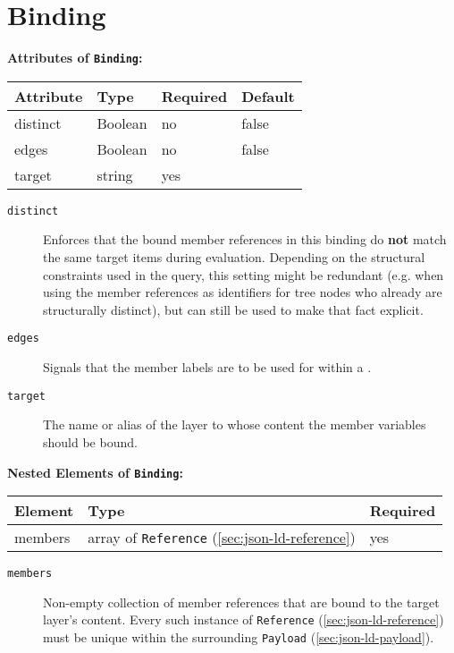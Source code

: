 \documentclass[11pt,a4paper]{report}
\newcommand{\iqlType}[1]{\texttt{\iqlns#1}}
\newenvironment{attributes}[1]{
	\noindent\textbf{Attributes of #1:}\newline\medskip
	\begin{tabular}{|p{0.3\textwidth}|p{0.20\textwidth}|p{0.20\textwidth}|p{0.17\textwidth}|}
		\hline
		\textbf{Attribute} & \textbf{Type} & \textbf{Required} & \textbf{Default} \\ 
		\hline
		\hline
	}{
	\end{tabular}
}
\newcommand{\attribute}[4]{
	#1 & #2 & #3 & #4 \\
	\hline
}
\newenvironment{elements}[1]{
	\noindent\textbf{Nested Elements of #1:}\newline\medskip
	\begin{tabular}{|p{0.3\textwidth}|p{0.42\textwidth}|p{0.17\textwidth}|}
		\hline
		\textbf{Element} & \textbf{Type} & \textbf{Required} \\ 
		\hline
		\hline
	}{
	\end{tabular}
}
\newcommand{\element}[3]{
	#1 & #2 & #3 \\
	\hline
}
\begin{document}
\section{Binding}
\label{sec:json-ld-binding}
\begin{attributes}{\iqlType{Binding}}
	\attribute{distinct}{Boolean}{no}{false}
	\attribute{edges}{Boolean}{no}{false}
	\attribute{target}{string}{yes}{}
\end{attributes}
\begin{description}
	\item[\iqlType{distinct}] Enforces that the bound member references in this binding do \textbf{not} match the same target items during evaluation. Depending on the structural constraints used in the query, this setting might be redundant (e.g. when using the member references as identifiers for tree nodes who already are structurally distinct), but can still be used to make that fact explicit. 
	\item[\iqlType{edges}] Signals that the member labels are to be used for  within a .
	\item[\iqlType{target}] The name or alias of the layer to whose content the member variables should be bound.
\end{description}
\begin{elements}{\iqlType{Binding}}
	\element{members}{array of \iqlType{Reference} (\ref{sec:json-ld-reference})}{yes}
\end{elements}
\begin{description}
	\item[\iqlType{members}] Non-empty collection of member references that are bound to the target layer's content. Every such instance of \iqlType{Reference} (\ref{sec:json-ld-reference}) must be unique within the surrounding \iqlType{Payload} (\ref{sec:json-ld-payload}).
\end{description}
\end{document}
